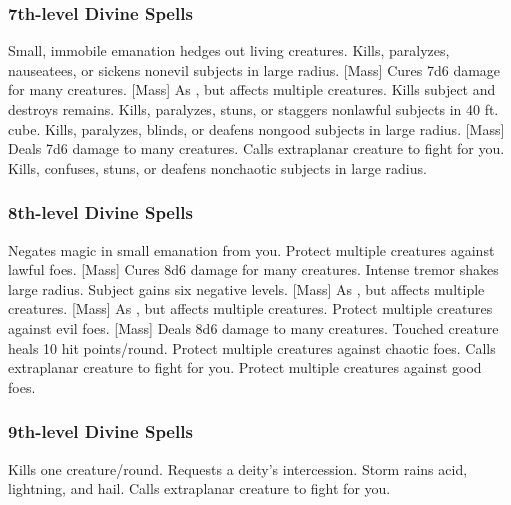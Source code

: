 \subsubsection{7th-level Divine Spells}
\begin{spelllist}
     Small, immobile emanation hedges out living creatures.
     Kills, paralyzes, nauseatees, or sickens nonevil subjects in large radius.
    [Mass] Cures 7d6 damage for many creatures.
    [Mass] As , but affects multiple creatures.
    \F Kills subject and destroys remains.
     Kills, paralyzes, stuns, or staggers nonlawful subjects in 40 ft. cube.
     Kills, paralyzes, blinds, or deafens nongood subjects in large radius.
    [Mass] Deals 7d6 damage to many creatures.
     Calls extraplanar creature to fight for you.
     Kills, confuses, stuns, or deafens nonchaotic subjects in large radius.
\end{spelllist}

\subsubsection{8th-level Divine Spells}
\begin{spelllist}
     Negates magic in small emanation from you.
    \F Protect multiple creatures against lawful foes. 
    [Mass] Cures 8d6 damage for many creatures.
     Intense tremor shakes large radius.
     Subject gains six negative levels.
    [Mass] As , but affects multiple creatures.
    [Mass] As , but affects multiple creatures.
    \F Protect multiple creatures against evil foes. 
    [Mass] Deals 8d6 damage to many creatures.
     Touched creature heals 10 hit points/round.
    \F Protect multiple creatures against chaotic foes. 
     Calls extraplanar creature to fight for you.
    \F Protect multiple creatures against good foes. 
\end{spelllist}

\subsubsection{9th-level Divine Spells}
\begin{spelllist}
     Kills one creature/round.
    \M Requests a deity's intercession.
     Storm rains acid, lightning, and hail.
     Calls extraplanar creature to fight for you.
\end{spelllist}

